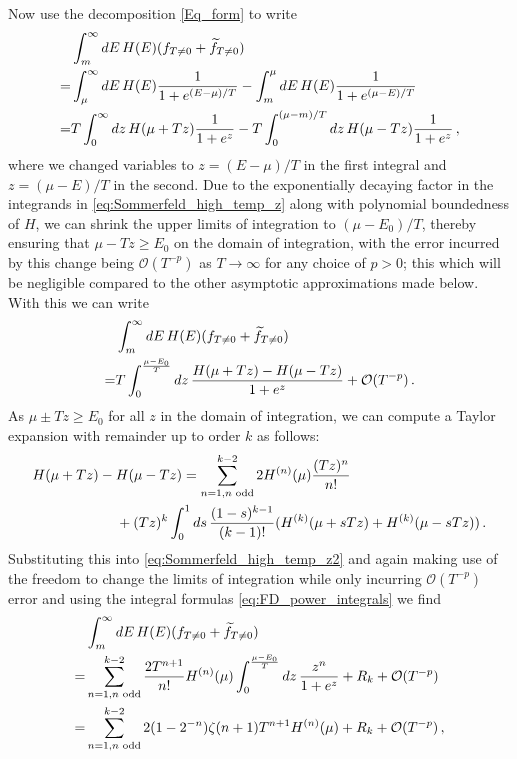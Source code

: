 \documentclass[sn-mathphys,Numbered]{sn-jnl}
\begin{document}
Now use  the decomposition \eqref{Eq_form} to write
\begin{align}
    &\int_m^\infty dE\, H(E)(f_{T\neq 0}+\widetilde{f}_{T\neq 0})\notag\\
    =&\int_\mu^\infty dE \,H(E)\frac{1}{1+e^{(E-\mu)/T}}-\int_m^\mu dE\, H(E)\frac{1}{1+e^{(\mu-E)/T}}\notag\\
=&T\int_0^\infty dz \,H(\mu+Tz)\frac{1}{1+e^{z}}-T\int^{(\mu-m)/T}_0 dz\, H(\mu-Tz)\frac{1}{1+e^{z}}\,,\label{eq:Sommerfeld_high_temp_z}
\end{align}
where we changed variables to $z=(E-\mu)/T$ in the first integral and $z=(\mu-E)/T$ in the second.  Due to the exponentially decaying factor in the integrands in \eqref{eq:Sommerfeld_high_temp_z} along with polynomial boundedness of $H$, we can shrink the upper limits of integration  to $(\mu-E_0)/T$, thereby ensuring that $\mu-Tz\geq E_0$ on the domain of integration, with the  error incurred by this change being $\mathcal{O}(T^{-p})$ as $T\to \infty$ for any choice of $p>0$; this which will be negligible compared to the other asymptotic approximations made below.  With this we can write
\begin{align}
    &\int_m^\infty dE\, H(E)(f_{T\neq 0}+\widetilde{f}_{T\neq 0})\notag\\
=&T\int_0^{\frac{\mu-E_0}{T}} dz \,\frac{H(\mu+Tz)- H(\mu-Tz)}{1+e^{z}}+\mathcal{O}(T^{-p})\,. \label{eq:Sommerfeld_high_temp_z2}
\end{align}
As $\mu\pm Tz\geq E_0$ for all $z$ in the domain of integration, we can compute a Taylor expansion with remainder up to order $k$ as follows:
\begin{align}
 &H(\mu+Tz)- H(\mu-Tz)=\sum_{n=1,n\text{ odd}}^{k-2} 2H^{(n)}(\mu)\frac{(Tz)^n}{n!}\\
 &\qquad\qquad\qquad+(Tz)^k \int_0^1 ds\,\frac{(1-s)^{k-1}}{(k-1)!} (H^{(k)}(\mu+sTz)+H^{(k)}(\mu-sTz))\,. \notag
\end{align}
Substituting this into \eqref{eq:Sommerfeld_high_temp_z2} and again making use of the freedom to change the limits of integration while only incurring $\mathcal{O}(T^{-p})$ error and using the integral formulas \eqref{eq:FD_power_integrals} we find
\begin{align}
    &\int_m^\infty dE\, H(E)(f_{T\neq 0}+\widetilde{f}_{T\neq 0})\notag\\
    =&\sum_{n=1,n\text{ odd}}^{k-2} \frac{2T^{n+1}}{n!}H^{(n)}(\mu)\int_0^{\frac{\mu-E_0}{T}} dz \,\frac{z^n}{1+e^{z}}+R_k
+\mathcal{O}(T^{-p})\notag\\
=&\sum_{n=1,n\text{ odd}}^{k-2} 2(1-2^{-n})\zeta(n+1)T^{n+1}H^{(n)}(\mu)
+R_k
+\mathcal{O}(T^{-p})\,,\label{eq:Sommerfeld_high_temp_z3}
\end{align}
\end{document}

